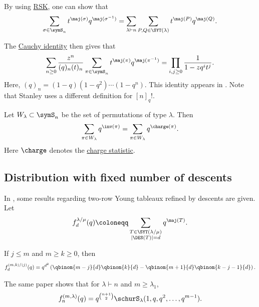 By using \hyperref[rsk]{RSK}, one can show that
\begin{equation}
  \sum_{\sigma \in \symS_n} t^{\maj(\sigma)} q^{\maj(\sigma^{-1})}
  =
  \sum_{\lambda \vdash n} \sum_{P,Q \in \SYT(\lambda)} t^{\maj(P)} q^{\maj(Q)}.
\end{equation}

The \hyperref[schurCauchyFormula]{Cauchy identity} then gives that
\begin{equation}
 \sum_{n \geq 0} \frac{z^n}{(q)_n (t)_n}
 \sum_{\pi \in \symS_n} t^{\maj(\pi)} q^{\maj(\pi^{-1})}
 =
 \prod_{i,j \geq 0} \frac{1}{1-z q^i t^j}.
\end{equation}
Here, $(q)_n = (1-q)(1-q^2)\dotsb (1-q^n)$.
This identity appears in \cite[Eq. (7.117)]{StanleyEC2}.
Note that Stanley uses a different definition for $[n]_q!$.



\begin{theorem}

Let $W_\lambda \subset \symS_n$ be the set of permutations of type $\lambda$.
Then
\[
\sum_{\pi \in W_\lambda} q^{\inv(\pi)}=
\sum_{\pi \in W_\lambda} q^{\charge(\pi)}.
\]
Here \(\charge\) denotes the \hyperref[chargeStatistic]{charge statistic}.
\end{theorem}



\subsection[prelimFixedDescentSet]{Distribution with fixed number of descents}

In \cite{Keith2018}, some results regarding two-row Young tableaux
refined by descents are given.
Let
\[
f^{\lambda/\mu}_d(q) \coloneqq  \sum_{\substack{ T \in \SYT(\lambda/\mu) \\ |\DES(T)|=d} } q^{\maj(T)}.
\]
\begin{theorem}[W. Keith, 2018]
If $j\leq m$ and $m\geq k\geq 0$, then
\begin{align}
f^{(m,k)/(j)}_d(q) =
  q^{d^2} \left(
 \qbinom{m-j}{d}
 \qbinom{k}{d}
 -
 \qbinom{m+1}{d}
 \qbinom{k-j-1}{d}
 \right).
\end{align}
\end{theorem}
The same paper shows that for $\lambda \vdash n$ and $m \geq \lambda_1$,
\begin{equation*}
f^{(m,\lambda)}_{n}(q) = q^{\binom{n+1}{2}}\schurS_{\lambda}(1,q,q^2,\dotsc,q^{m-1}).
\end{equation*}



